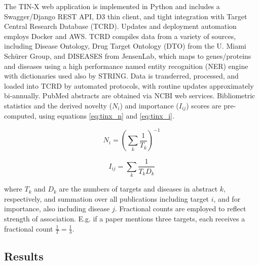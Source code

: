The TIN-X web application is implemented in Python and includes a Swagger/Django REST API, D3 thin client, and tight integration with Target Central Research Database (TCRD)\cite{Nguyen2017-lo}. Updates and deployment automation employs Docker and AWS. TCRD compiles data from a variety of sources, including Disease Ontology\cite{Kibbe2015-li}, Drug Target Ontology (DTO)\cite{Vempati2012-ns} from the U. Miami Sch\"urer Group, and DISEASES\cite{Pletscher-Frankild2015-oo} from JensenLab, which maps to genes/proteins and diseases using a high performance named entity recognition (NER) engine\cite{Pafilis2013-ml} with dictionaries used also by STRING\cite{Szklarczyk2015-bl}.  Data is transferred, processed, and loaded into TCRD by automated protocols, with routine updates approximately bi-annually.  PubMed abstracts are obtained via NCBI web services.  Bibliometric statistics and the derived novelty ($N_i$) and importance ($I_{ij}$) scores are pre-computed, using equations \ref{eq:tinx_n} and \ref{eq:tinx_i}.

\begin{equation}
N_i = (\sum_{k}^{}\frac{1}{T_k})^{-1}
\label{eq:tinx_n}
\end{equation}

\begin{equation}
I_{ij} = \sum_{k}^{}\frac{1}{T_kD_k}
\label{eq:tinx_i}
\end{equation}

where $T_k$ and $D_k$ are the numbers of targets and diseases in abstract $k$, respectively, and summation over all publications including target $i$, and for importance, also including disease $j$. Fractional counts are employed to reflect strength of association.  E.g. if a paper mentions three targets, each receives a fractional count $\frac{1}{T} = \frac{1}{3}$.

\subsection{Results}

